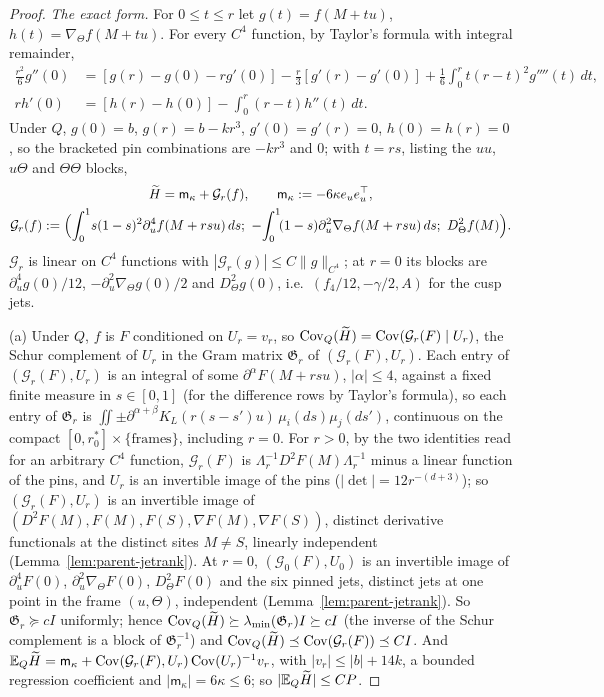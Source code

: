 \begin{proof}
\emph{The exact form.} For $0\le t\le r$ let $g(t)=f(M+tu)$, $h(t)=\nabla_\Theta f(M+tu)$. For every $C^4$ function, by Taylor's formula with integral remainder,
\[
\begin{aligned}
\tfrac{r^2}6g''(0)&=[g(r)-g(0)-rg'(0)]-\tfrac r3[g'(r)-g'(0)]+\tfrac16\int_0^rt(r-t)^2g''''(t)\,dt,\\
rh'(0)&=[h(r)-h(0)]-\int_0^r(r-t)h''(t)\,dt.
\end{aligned}
\]
Under $Q$, $g(0)=b$, $g(r)=b-kr^3$, $g'(0)=g'(r)=0$, $h(0)=h(r)=0$, so the bracketed pin combinations are $-kr^3$ and $0$; with $t=rs$, listing the $uu$, $u\Theta$ and $\Theta\Theta$ blocks,
\begin{equation}\label{eq:third-H1}
\begin{gathered}
\widetilde H=\mathsf m_\kappa+\mathcal G_r(f),\qquad \mathsf m_\kappa:=-6\kappa e_ue_u^\top,\\
\mathcal G_r(f):=\Bigl(\int_0^1\!s(1-s)^2\partial_u^4f(M+rsu)\,ds;\ -\!\int_0^1\!(1-s)\partial_u^2\nabla_\Theta f(M+rsu)\,ds;\ D^2_\Theta f(M)\Bigr).
\end{gathered}
\end{equation}
$\mathcal G_r$ is linear on $C^4$ functions with $|\mathcal G_r(g)|\le C\|g\|_{C^4}$; at $r=0$ its blocks are $\partial_u^4g(0)/12$, $-\partial_u^2\nabla_\Theta g(0)/2$ and $D^2_\Theta g(0)$, i.e.\ $(f_4/12,-\gamma/2,A)$ for the cusp jets.

(a) Under $Q$, $f$ is $F$ conditioned on $U_r=v_r$, so $\operatorname{Cov}_Q(\widetilde H)=\operatorname{Cov}(\mathcal G_r(F)\mid U_r)$, the Schur complement of $U_r$ in the Gram matrix $\mathfrak G_r$ of $(\mathcal G_r(F),U_r)$. Each entry of $(\mathcal G_r(F),U_r)$ is an integral of some $\partial^\alpha F(M+rsu)$, $|\alpha|\le4$, against a fixed finite measure in $s\in[0,1]$ (for the difference rows by Taylor's formula), so each entry of $\mathfrak G_r$ is $\iint\pm\partial^{\alpha+\beta}K_L(r(s-s')u)\,\mu_i(ds)\mu_j(ds')$, continuous on the compact $[0,r_0^*]\times\{\text{frames}\}$, including $r=0$. For $r>0$, by the two identities read for an arbitrary $C^4$ function, $\mathcal G_r(F)$ is $\Lambda_r^{-1}D^2F(M)\Lambda_r^{-1}$ minus a linear function of the pins, and $U_r$ is an invertible image of the pins ($|\det|=12r^{-(d+3)}$); so $(\mathcal G_r(F),U_r)$ is an invertible image of $(D^2F(M),F(M),F(S),\nabla F(M),\nabla F(S))$, distinct derivative functionals at the distinct sites $M\ne S$, linearly independent \cite{parentP} (Lemma~\ref{lem:parent-jetrank}). At $r=0$, $(\mathcal G_0(F),U_0)$ is an invertible image of $\partial_u^4F(0)$, $\partial_u^2\nabla_\Theta F(0)$, $D^2_\Theta F(0)$ and the six pinned jets, distinct jets at one point in the frame $(u,\Theta)$, independent \cite{parentP} (Lemma~\ref{lem:parent-jetrank}). So $\mathfrak G_r\succeq cI$ uniformly; hence $\operatorname{Cov}_Q(\widetilde H)\succeq\lambda_{\min}(\mathfrak G_r)I\succeq cI$ (the inverse of the Schur complement is a block of $\mathfrak G_r^{-1}$) and $\operatorname{Cov}_Q(\widetilde H)\preceq\operatorname{Cov}(\mathcal G_r(F))\preceq CI$. And $\mathbb E_Q\widetilde H=\mathsf m_\kappa+\operatorname{Cov}(\mathcal G_r(F),U_r)\operatorname{Cov}(U_r)^{-1}v_r$, with $|v_r|\le|b|+14k$, a bounded regression coefficient and $|\mathsf m_\kappa|=6\kappa\le6$; so $|\mathbb E_Q\widetilde H|\le CP$.


\end{proof}
